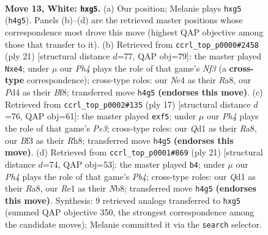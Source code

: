 \documentclass[11pt]{article}
\begin{document}
\clearpage

\begin{figure}[p]\centering
\begin{subfigure}{0.46\textwidth}\centering
\resizebox{\linewidth}{!}{%
\newchessgame
\chessboard[
  setfen={r1bqr1k1/1pp1bp1p/2n1p3/p2n2p1/2NP3P/4PBP1/PP3P2/RNBQR1K1 w - - 0 13},
  showmover=false,
  pgfstyle=straightmove, color=movearrow, markmove={h4-g5}
]}
\caption{}
\end{subfigure}\hfill
\begin{subfigure}{0.46\textwidth}\centering
\resizebox{\linewidth}{!}{%
\newchessgame
\chessboard[
  setfen={r3kb1r/1pq2pp1/p1npbn1p/4p3/P1N1P3/2N5/1PP1BPPP/R1BQ1RK1 b kq - 2 11},
  showmover=false,
  pgfstyle=straightmove, color=movearrow, markmove={f6-e4}
]}
\caption{}
\end{subfigure}
\\[4pt]
\begin{subfigure}{0.46\textwidth}\centering
\resizebox{\linewidth}{!}{%
\newchessgame
\chessboard[
  setfen={r1b1kb1r/1pq2ppp/p1nppn2/5P2/3NP3/1BN5/PPP3PP/R1BQK2R b KQkq - 0 9},
  showmover=false,
  pgfstyle=straightmove, color=movearrow, markmove={e6-f5}
]}
\caption{}
\end{subfigure}\hfill
\begin{subfigure}{0.46\textwidth}\centering
\resizebox{\linewidth}{!}{%
\newchessgame
\chessboard[
  setfen={rn2kb1r/1bq2p1p/p2p1np1/1p2p3/P3P3/2N3NP/1PP1BPP1/R1BQ1RK1 b kq - 0 11},
  showmover=false,
  pgfstyle=straightmove, color=movearrow, markmove={b5-b4}
]}
\caption{}
\end{subfigure}
\caption{\textbf{Move 13, White: \texttt{hxg5}.} (a) Our position; Melanie plays \texttt{hxg5} (\texttt{h4g5}). Panels (b)--(d) are the retrieved master positions whose correspondence most drove this move (highest QAP objective among those that transfer to it). (b) Retrieved from \texttt{ccrl\_top\_p0000\#2458} (ply 21) [structural distance $d$=77, QAP obj=79]: the master played \texttt{Nxe4}; under $\mu$ our \emph{Ph4} plays the role of that game's \emph{Nf3} (a \textbf{cross-type} correspondence); cross-type roles: our \emph{N}c4 as their \emph{R}a8, our \emph{P}d4 as their \emph{B}f8; transferred move \texttt{h4g5} \textbf{(endorses this move)}. (c) Retrieved from \texttt{ccrl\_top\_p0002\#135} (ply 17) [structural distance $d$=76, QAP obj=61]: the master played \texttt{exf5}; under $\mu$ our \emph{Ph4} plays the role of that game's \emph{Pe3}; cross-type roles: our \emph{Q}d1 as their \emph{R}a8, our \emph{B}f3 as their \emph{R}h8; transferred move \texttt{h4g5} \textbf{(endorses this move)}. (d) Retrieved from \texttt{ccrl\_top\_p0001\#869} (ply 21) [structural distance $d$=74, QAP obj=53]: the master played \texttt{b4}; under $\mu$ our \emph{Ph4} plays the role of that game's \emph{Pb4}; cross-type roles: our \emph{Q}d1 as their \emph{R}a8, our \emph{R}e1 as their \emph{N}b8; transferred move \texttt{h4g5} \textbf{(endorses this move)}. Synthesis: 9 retrieved analogs transferred to \texttt{hxg5} (summed QAP objective 350, the strongest correspondence among the candidate moves); Melanie committed it via the \texttt{search} selector.}
\label{fig:thought-m24}
\end{figure}
\end{document}
